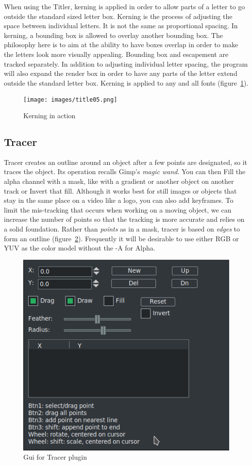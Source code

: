 {When using the Titler, kerning is applied in order to allow parts of a letter to go outside the standard sized letter box.  Kerning is the process of adjusting the space between individual letters.  It is not the same as proportional spacing.  In kerning, a bounding box is allowed to overlay another bounding box.  The philosophy here is to aim at the ability to have boxes overlap in order to make the letters look more visually appealing.  Bounding box and escapement are tracked separately.  In addition to adjusting individual letter spacing, the program will also expand the render box in order to have any parts of the letter extend outside the standard letter box.  Kerning is applied to any and all fonts (figure~\ref{fig:title05}).

\begin{figure}[hbtp]
    \centering
    \texttt{[image: images/title05.png]}
    \caption{Kerning in action}
    \label{fig:title05}
\end{figure}

\subsection{Tracer}%
\label{sub:tracer}

Tracer creates an outline around an object after a few points are designated, so it traces the object. Its operation recalls Gimp's \textit{magic wand}. You can then Fill the alpha channel with a mask, like with a gradient or another object on another track or Invert that fill. Although it works best for still images or objects that stay in the same place on a video like a logo, you can also add keyframes. To limit the mis-tracking that occurs when working on a moving object, we can increase the number of points so that the tracking is more accurate and relies on a solid foundation. Rather than \textit{points} as in a mask, tracer is based on \textit{edges} to form an outline (figure~\ref{fig:tracer-01}). Frequently it will be desirable to use either RGB or YUV as the color model without the -A for Alpha.

\begin{figure}[hbtp]
	\centering
	\includegraphics[width=0.55\linewidth]{images/tracer-01.png}
	\caption{Gui for Tracer plugin}
	\label{fig:tracer-01}
\end{figure}

}
